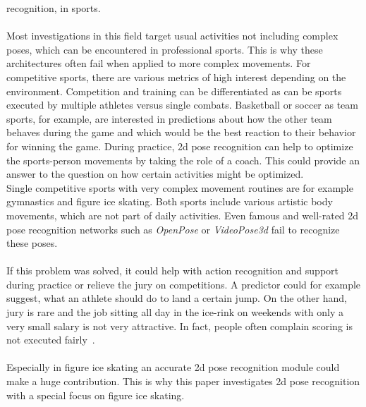 recognition, in sports.
\\\mbox{}\\
Most investigations in this field target usual activities not including complex poses, which can be encountered in
professional sports.
This is why these architectures often fail when applied to more complex movements.
For competitive sports, there are various metrics of high interest depending on the environment.
Competition and training can be differentiated as can be sports executed by multiple athletes versus single combats.
Basketball or soccer as team sports, for example, are interested in predictions about
how the other team behaves during the game and which would be the best reaction to their behavior for winning
the game.
During practice, 2d pose recognition can help to optimize the sports-person movements by taking the role of a coach.
This could provide an answer to the question on how certain activities might be optimized. \\
Single competitive sports with very complex movement routines are for example gymnastics and figure ice skating.
Both sports include various artistic body movements, which are not part of daily activities.
Even famous and well-rated 2d pose recognition networks such as \textit{OpenPose} or \textit{VideoPose3d} fail to recognize these
poses.
\\\mbox{}\\
If this problem was solved, it could help with action recognition and support during practice or relieve the jury
on competitions.
A predictor could for example suggest, what an athlete should do to land a certain jump.
On the other hand, jury is rare and the job sitting all day in the ice-rink on weekends with only a very small
salary is not very attractive.
In fact, people often complain scoring is not executed fairly~\cite{ungerjuryinterview, juryunger3minutes, unfairjudge}.
\\\mbox{}\\
Especially in figure ice skating an accurate 2d pose recognition module could make a huge contribution.
This is why this paper investigates 2d pose recognition with a special focus on figure ice skating.
%




